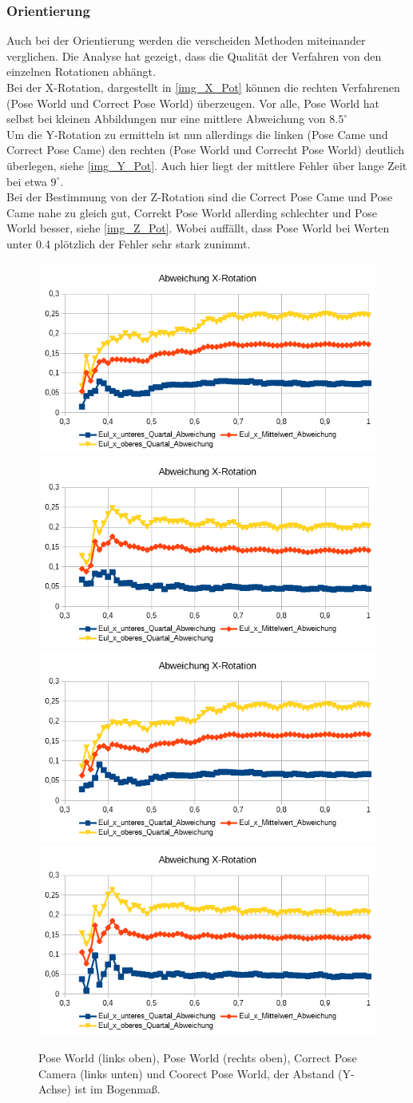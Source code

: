 \subsubsection{Orientierung}
Auch bei der Orientierung werden die verscheiden Methoden miteinander verglichen. Die Analyse hat gezeigt, dass die Qualität der Verfahren von den einzelnen Rotationen abhängt.\\
Bei der X-Rotation, dargestellt in \autoref{img_X_Pot} können die rechten Verfahrenen (Pose World und Correct Pose World) überzeugen. Vor alle, Pose World hat selbst bei kleinen Abbildungen nur eine mittlere Abweichung von $8.5^\circ$\\
Um die Y-Rotation zu ermitteln ist nun allerdings die linken (Pose Came und Correct Pose Came) den rechten (Pose World und Correcht Pose World) deutlich überlegen, siehe \autoref{img_Y_Pot}. Auch hier liegt der mittlere Fehler über lange Zeit bei etwa $9^\circ$.\\
Bei der Bestimmung von der Z-Rotation sind die Correct Pose Came und Pose Came nahe zu gleich gut, Correkt Pose World allerding schlechter und Pose World besser, siehe \autoref{img_Z_Pot}. Wobei auffällt, dass Pose World bei Werten unter 0.4 plötzlich der Fehler sehr stark zunimmt.
\begin{figure}
	\centering
	\includegraphics[width=0.45\linewidth]{tabelle/X_Rot_PC}
	\includegraphics[width=0.45\linewidth]{tabelle/X_Rot_PW}
	\includegraphics[width=0.45\linewidth]{tabelle/X_Rot_CPC}
	\includegraphics[width=0.45\linewidth]{tabelle/X_Rot_CPW}
	\caption{Pose World (links oben), Pose World (rechts oben), Correct Pose Camera (links unten) und Coorect Pose World, der Abstand (Y-Achse) ist im Bogenmaß.}
	\label{img_X_Pot}
\end{figure}

